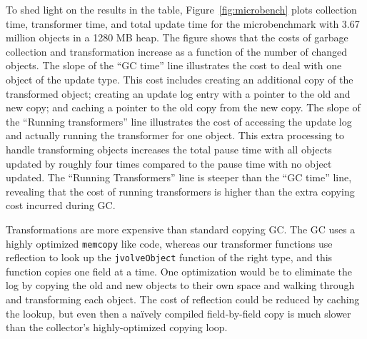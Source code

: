 To shed light on the results in the table, Figure~\ref{fig:microbench}
plots collection time, transformer time, and total update time for the
microbenchmark with 3.67 million objects in a 1280 MB heap.  The figure
shows that the costs of garbage collection and transformation increase  as
a function of the number of changed objects.  The slope of the ``GC time''
line illustrates the cost to deal with one object of the update type.  This
cost includes creating an additional copy of the transformed object;
creating an update log entry with a pointer to the old and new copy; and
caching a pointer to the old copy from the new copy. The slope of the
``Running transformers'' line illustrates the cost of accessing the update
log and actually running the transformer for one object.  This extra
processing to handle transforming objects increases the total pause time
with all objects updated by roughly four times compared to the pause time
with no object updated.  The ``Running Transformers'' line is steeper than
the ``GC time'' line, revealing that the cost of running transformers is
higher than the extra copying cost incurred during GC\@.

Transformations are more expensive than standard copying GC. The GC uses a
highly optimized {\tt memcopy} like code, whereas our transformer functions
use reflection to look up the \texttt{jvolveObject} function of the right
type, and this function copies one field at a time. One optimization would
be to eliminate the log by copying the old and new objects to their own
space and walking through and transforming each object.  The cost of
reflection could be reduced by caching the lookup, but even then a
na\"ively compiled field-by-field copy is much slower than the collector's
highly-optimized copying loop.  %
